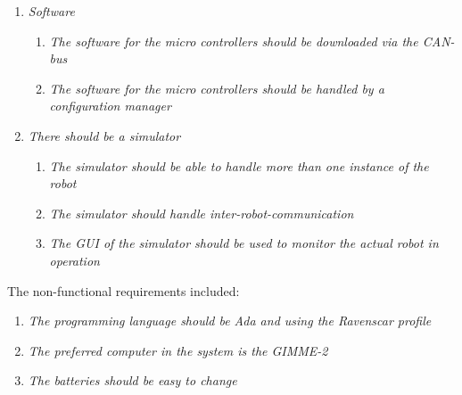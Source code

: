\begin{enumerate}
   \item { \em Software} 
   \begin{enumerate}
   		\item { \em The software for the micro controllers should be downloaded via the 				CAN-bus} 
   		\item { \em The software for the micro controllers should be handled by a 					configuration manager}	
   \end{enumerate}
   \item { \em There should be a simulator} 
      \begin{enumerate}
   		\item { \em The simulator should be able to handle more than one instance
			of the robot} 
   		\item { \em The simulator should handle inter-robot-communication} 
		\item { \em The GUI of the simulator should be used to monitor the actual
				robot in operation} 		
   \end{enumerate}
\end{enumerate}

The non-functional requirements included:
\begin{enumerate}
   \item { \em The programming language should be Ada and using the Ravenscar profile} 
   \item { \em The preferred computer in the system is the GIMME-2} 
   \item { \em The batteries should be easy to change} 
\end{enumerate}
